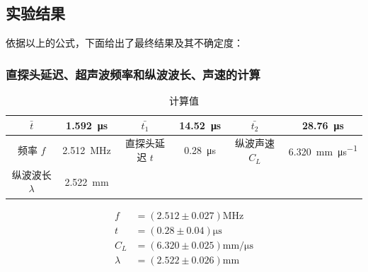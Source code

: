 \documentclass[a4paper,utf8]{article}
\begin{document}
    \subsection{实验结果}
        依据以上的公式，下面给出了最终结果及其不确定度：\par
        \subsubsection{直探头延迟、超声波频率和纵波波长、声速的计算}
            \begin{table}[!ht]\caption{计算值}
                \centering\begin{tabular}{c c|c c|c c}\hline
                    $\bar t$ & \SI{1.592}{\us} & $\bar{t_1}$ & \SI{14.52}{\us}& $\bar{t_2}$ & \SI{28.76}{\us} \\ \hline
                    频率 $f$ & \SI{2.512}{\MHz} & 直探头延迟 $t$ & \SI{0.28}{\us}& 纵波声速 $C_L$ & \SI{6.320}{\mm\per\us} \\ \hline
                    纵波波长 $\lambda$ & \SI{2.522}{\mm} &  & & & \\ \hline
                \end{tabular}
            \end{table}\par
            \begin{align*}
                f &= (2.512 \pm 0.027) \unit{\MHz}\\
                t &= (0.28 \pm 0.04) \unit{\us}\\
                C_L &= (6.320 \pm 0.025) \unit{\mm\per\us}\\
                \lambda &= (2.522 \pm 0.026) \unit{\mm}
            \end{align*}
\end{document}
